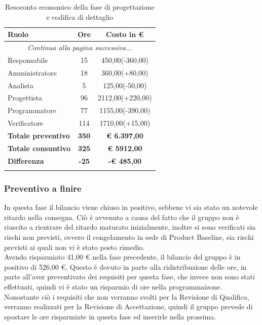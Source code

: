 \documentclass[../piano_di_progetto.tex]{subfiles}
\begin{document}

\begin{center}
	\begin{longtable}{|l|c|c|}
		\hline
		\rowcolor{lightgray}
		\textbf{Ruolo} & \textbf{Ore} & \textbf{Costo in €}\\
		\hline
		\endhead
		
		\hline
		\multicolumn{3}{|c|}{\emph{Continua alla pagina successiva...}}\\
		\hline
		\endfoot

		\endlastfoot
		Responsabile & 	 15 	 & 450,00(-360,00) \\
		Amministratore & 18 	 & 360,00(+80,00) \\
		Analista & 		5 	 & 125,00(-50,00) \\
		Progettista &    96  &  2112,00(+220,00) \\
		Programmatore &  77   & 1155,00(-390,00) \\
		Verificatore &   114  & 1710,00(+15,00) \\
		\hline
		\textbf{Totale preventivo} & \textbf{350} & \textbf{€ 6.397,00} \\
		\hline
		\textbf{Totale consuntivo} & \textbf{325} & \textbf{€ 5912,00} \\
		\hline
		\textbf{Differenza} & \textbf{-25} & \textbf{-€ 485,00}\\
		\hline
		\rowcolor{white}
		\caption{Resoconto economico della fase di progettazione e codifica di dettaglio}
	\end{longtable}
\end{center}


\subsubsection{Preventivo a finire}
\label{sub:cons_prev_fine_4} 
In questa fase il bilancio viene chiuso in positivo, sebbene vi sia stato un notevole ritardo nella consegna. Ciò è avvenuto a causa del fatto che il gruppo non è riuscito a rientrare del ritardo maturato inizialmente, 
inoltre si sono verificati sia rischi non previsti, ovvero il congelamento in sede di Product Baseline, sia rischi previsti ai quali non vi è stato posto rimedio. \\
Avendo risparmiato 41,00 € nella fase precedente, il bilancio del gruppo è in positivo di 526,00 €. Questo è dovuto in parte alla ridistribuzione delle ore, in parte all'aver preventivato dei requisiti per questa fase,
che invece non sono stati effettuati, quindi vi è stato un risparmio di ore nella programmaizone. Nonostante ciò i requisiti che non verranno svolti per la Revisione di Qualifica, verranno realizzati per la 
Revisione di Accettazione, quindi il gruppo prevede di spostare le ore risparmiate in questa fase ed inserirle nella prossima. \\
\end{document}
